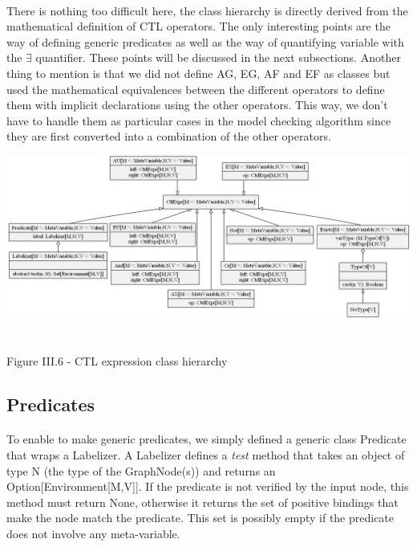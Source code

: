 \documentclass{report}
\begin{document}
\paragraph{}
\hspace{4mm}There is nothing too difficult here, the class hierarchy is directly derived from the mathematical
definition of CTL operators. The only interesting points are the way of defining generic predicates as well as the way of quantifying variable with the $\exists$ quantifier. These points
will be discussed in the next subsections. Another thing to mention is that we did not define AG, EG, AF and EF as classes but used the mathematical equivalences between the different operators
to define them with implicit declarations using the other operators. This way, we don't have to handle them as particular cases in the model checking algorithm since they are first converted into
a combination of the other operators.

\begin{center}
\includegraphics[scale=0.4]{data/CTL_expr.png}
~\\~\\Figure III.6 - CTL expression class hierarchy
\end{center}

\subsection* {Predicates}
\paragraph{}
\hspace{4mm}To enable to make generic predicates, we simply defined a generic class Predicate that wraps a Labelizer. A Labelizer
defines a \textit{test} method that takes an object of type N (the type of the GraphNode(s)) and returns an Option[Environment[M,V]].
If the predicate is not verified by the input node, this method must return None, otherwise it returns the set of positive bindings that make the node
match the predicate. This set is possibly empty if the predicate does not involve any meta-variable.
\end{document}
